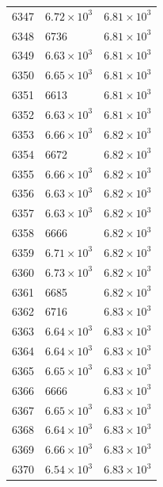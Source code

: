 \begin{table}[H]
\begin{tabular}{lll}
6347 & $\displaystyle 6.72 \times 10^{3}$ & $\displaystyle 6.81 \times 10^{3}$ \\
6348 & 6736 & $\displaystyle 6.81 \times 10^{3}$ \\
6349 & $\displaystyle 6.63 \times 10^{3}$ & $\displaystyle 6.81 \times 10^{3}$ \\
6350 & $\displaystyle 6.65 \times 10^{3}$ & $\displaystyle 6.81 \times 10^{3}$ \\
6351 & 6613 & $\displaystyle 6.81 \times 10^{3}$ \\
6352 & $\displaystyle 6.63 \times 10^{3}$ & $\displaystyle 6.81 \times 10^{3}$ \\
6353 & $\displaystyle 6.66 \times 10^{3}$ & $\displaystyle 6.82 \times 10^{3}$ \\
6354 & 6672 & $\displaystyle 6.82 \times 10^{3}$ \\
6355 & $\displaystyle 6.66 \times 10^{3}$ & $\displaystyle 6.82 \times 10^{3}$ \\
6356 & $\displaystyle 6.63 \times 10^{3}$ & $\displaystyle 6.82 \times 10^{3}$ \\
6357 & $\displaystyle 6.63 \times 10^{3}$ & $\displaystyle 6.82 \times 10^{3}$ \\
6358 & 6666 & $\displaystyle 6.82 \times 10^{3}$ \\
6359 & $\displaystyle 6.71 \times 10^{3}$ & $\displaystyle 6.82 \times 10^{3}$ \\
6360 & $\displaystyle 6.73 \times 10^{3}$ & $\displaystyle 6.82 \times 10^{3}$ \\
6361 & 6685 & $\displaystyle 6.82 \times 10^{3}$ \\
6362 & 6716 & $\displaystyle 6.83 \times 10^{3}$ \\
6363 & $\displaystyle 6.64 \times 10^{3}$ & $\displaystyle 6.83 \times 10^{3}$ \\
6364 & $\displaystyle 6.64 \times 10^{3}$ & $\displaystyle 6.83 \times 10^{3}$ \\
6365 & $\displaystyle 6.65 \times 10^{3}$ & $\displaystyle 6.83 \times 10^{3}$ \\
6366 & 6666 & $\displaystyle 6.83 \times 10^{3}$ \\
6367 & $\displaystyle 6.65 \times 10^{3}$ & $\displaystyle 6.83 \times 10^{3}$ \\
6368 & $\displaystyle 6.64 \times 10^{3}$ & $\displaystyle 6.83 \times 10^{3}$ \\
6369 & $\displaystyle 6.66 \times 10^{3}$ & $\displaystyle 6.83 \times 10^{3}$ \\
6370 & $\displaystyle 6.54 \times 10^{3}$ & $\displaystyle 6.83 \times 10^{3}$ \\

\end{tabular}
\end{table}
